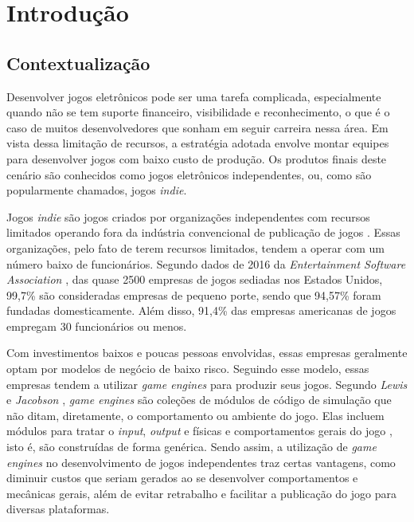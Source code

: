 \chapter*[Introdução]{Introdução}

\section*{Contextualização}

Desenvolver jogos eletrônicos pode ser uma tarefa complicada, especialmente quando não se tem suporte financeiro, visibilidade e reconhecimento, o que é o caso de muitos desenvolvedores que sonham em seguir carreira nessa área. Em vista dessa limitação de recursos, a estratégia adotada envolve montar equipes para desenvolver jogos com baixo custo de produção. Os produtos finais deste cenário são conhecidos como jogos eletrônicos independentes, ou, como são popularmente chamados, jogos \textit{indie}.

Jogos \textit{indie} são jogos criados por organizações independentes com recursos limitados operando fora da indústria convencional de publicação de jogos \cite{end2end}. Essas organizações, pelo fato de terem recursos limitados, tendem a operar com um número baixo de funcionários. Segundo dados de 2016 da \textit{Entertainment Software Association} \cite{esa2016}, das quase 2500 empresas de jogos sediadas nos Estados Unidos, 99,7\% são consideradas empresas de pequeno porte, sendo que 94,57\% foram fundadas domesticamente. Além disso, 91,4\% das empresas americanas de jogos empregam 30 funcionários ou menos.

Com investimentos baixos e poucas pessoas envolvidas, essas empresas geralmente optam por modelos de negócio de baixo risco. Seguindo esse modelo, essas empresas tendem a utilizar \textit{game engines} para produzir seus jogos. Segundo \textit{Lewis} e \textit{Jacobson} \cite{gameengines}, \textit{game engines} são coleções de módulos de código de simulação que não ditam, diretamente, o comportamento ou ambiente do jogo. Elas incluem módulos para tratar o \textit{input}, \textit{output} e físicas e comportamentos gerais do jogo \cite{gameengines}, isto é, são construídas de forma genérica. Sendo assim, a utilização de \textit{game engines} no desenvolvimento de jogos independentes traz certas vantagens, como diminuir custos que seriam gerados ao se desenvolver comportamentos e mecânicas gerais, além de evitar retrabalho e facilitar a publicação do jogo para diversas plataformas.

